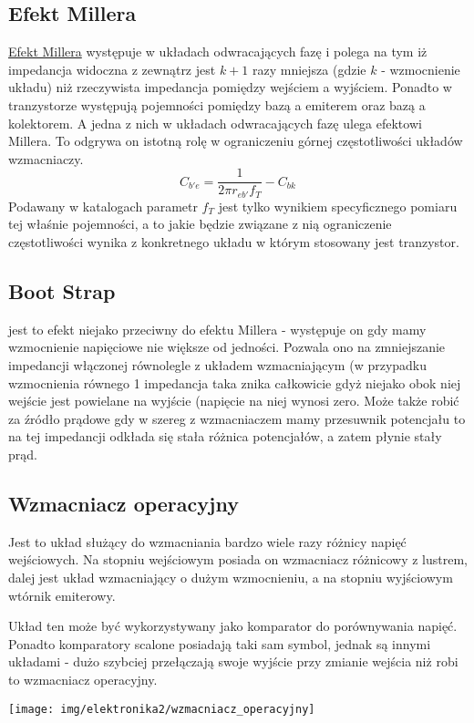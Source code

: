 \documentclass{pdfBooklets}
\begin{document}
\subsection{Efekt Millera}
\href{https://pl.wikipedia.org/wiki/Efekt_Millera}{Efekt Millera} występuje w układach odwracających fazę i polega na tym iż impedancja widoczna z zewnątrz jest $k+1$ razy mniejsza (gdzie $k$ - wzmocnienie układu) niż rzeczywista impedancja pomiędzy wejściem a wyjściem.
Ponadto w tranzystorze występują pojemności pomiędzy bazą a emiterem oraz bazą a kolektorem.
A jedna z nich w układach odwracających fazę ulega efektowi Millera. To odgrywa on istotną rolę w ograniczeniu górnej częstotliwości układów wzmacniaczy.
$$C_{b'e} = \frac{1}{2 \pi r_{eb'} f_T} - C_{bk}$$
Podawany w katalogach parametr $f_T$ jest tylko wynikiem specyficznego pomiaru tej właśnie pojemności, a to jakie będzie związane z nią ograniczenie częstotliwości wynika z konkretnego układu w którym stosowany jest tranzystor.

\subsection{Boot Strap}
jest to efekt niejako przeciwny do efektu Millera - występuje on gdy mamy wzmocnienie napięciowe nie większe od jedności.
Pozwala ono na zmniejszanie impedancji włączonej równolegle z układem wzmacniającym (w przypadku wzmocnienia równego 1 impedancja taka znika całkowicie gdyż niejako obok niej wejście jest powielane na wyjście (napięcie na niej wynosi zero.
Może także robić za źródło prądowe gdy w szereg z wzmacniaczem mamy przesuwnik potencjału to na tej impedancji odkłada się stała różnica potencjałów, a zatem płynie stały prąd.

\subsection{Wzmacniacz operacyjny}
Jest to układ służący do wzmacniania bardzo wiele razy różnicy napięć wejściowych.
Na stopniu wejściowym posiada on wzmacniacz różnicowy z lustrem, dalej jest układ wzmacniający o dużym wzmocnieniu, a na stopniu wyjściowym wtórnik emiterowy.

Układ ten może być wykorzystywany jako komparator do porównywania napięć.
Ponadto komparatory scalone posiadają taki sam symbol, jednak są innymi układami - dużo szybciej przełączają swoje wyjście przy zmianie wejścia niż robi to wzmacniacz operacyjny.

\begin{center}\texttt{[image: img/elektronika2/wzmacniacz\_operacyjny]}\end{center}
\end{document}
